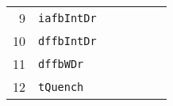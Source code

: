 \begin{table*}[!ht]
\begin{tabular*}{\textwidth}{@{}rlrrrrr@{}}
\footnotesize{9}   & \footnotesize{\texttt{iafbIntDr}}  &                        &                                 &&                         &    \\
\footnotesize{10}  & \footnotesize{\texttt{dffbIntDr}}  &                        &                                 &&                         &    \\
\footnotesize{11}  & \footnotesize{\texttt{dffbWDr}}    &                        &                                 &&                         &    \\
\footnotesize{12}  & \footnotesize{\texttt{tQuench}}    &                        &                                 &&                         &    \\
\bottomrule
\end{tabular*}
\end{table*}
